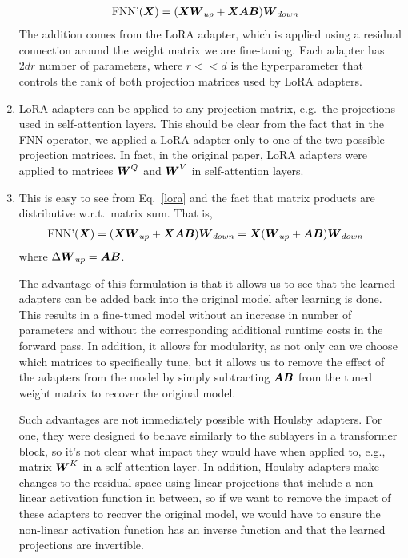 \documentclass[11pt,a4paper]{article}
\newcommand\op[1]{\operatorname{#1}}
\begin{document}
\begin{enumerate}[label=(\alph*)]
\begin{align}
              \op{FNN'}(\mX) & = (\mX\mW_{up} + \mX\mA\mB)\mW_{down}
          \end{align}
          The addition comes from the LoRA adapter, which is applied using a
          residual connection around the weight matrix we are fine-tuning.
          Each adapter has $2dr$ number of parameters, where $r << d$ is
          the hyperparameter that controls the rank of both projection matrices
          used by LoRA adapters.
    \item LoRA adapters can be applied to any projection matrix, e.g.\ the
          projections used in self-attention layers. This should be clear from
          the fact that in the FNN operator, we applied a LoRA adapter only to
          one of the two possible projection matrices.
          In fact, in the original paper, LoRA adapters were applied to matrices
          ${\boldsymbol{W}}^Q$ and ${\boldsymbol{W}}^V$ in self-attention layers.
    \item This is easy to see from Eq.~\ref{lora} and the fact
          that matrix products are distributive w.r.t.\ matrix sum.
          That is,
          \begin{align}
              \op{FNN'}(\mX) & = (\mX\mW_{up} + \mX\mA\mB)\mW_{down} = \mX(\mW_{up} + \mA\mB)\mW_{down}
          \end{align}
          where $\Delta{\boldsymbol{W}}_{up} = {\boldsymbol{A}}{\boldsymbol{B}}$.

          The advantage of this formulation is that it allows us to see that
          the learned adapters can be added back into the original model after
          learning is done. This results in a fine-tuned model without an
          increase in number of parameters and without the corresponding
          additional runtime costs in the forward pass.
          In addition, it allows for modularity, as not only can we choose which
          matrices to specifically tune, but it allows us to remove the effect
          of the adapters from the model by simply subtracting ${\boldsymbol{A}}{\boldsymbol{B}}$ from the
          tuned weight matrix to recover the original model.

          Such advantages are not immediately possible with Houlsby adapters.
          For one, they were designed to behave similarly to the sublayers in a
          transformer block, so it's not clear what impact they would have when
          applied to, e.g., matrix ${\boldsymbol{W}}^K$ in a self-attention layer.
          In addition, Houlsby adapters make changes to the residual space using
          linear projections that include a non-linear activation function in
          between, so if we want to remove the impact of these adapters to
          recover the original model, we would have to ensure the non-linear
          activation function has an inverse function and that the learned
          projections are invertible.

\end{enumerate}
\end{document}
